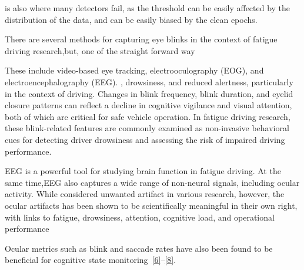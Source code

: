 is also where many detectors fail, as the threshold can be easily affected by the distribution of the data, and can be easily biased by the clean epochs.


There are several methods for capturing eye blinks in the context of fatigue driving research,but, one of the straight forward way


These include video-based eye tracking, electrooculography (EOG), and electroencephalography (EEG).
, drowsiness, and reduced alertness, particularly in the context of driving. Changes in blink frequency, blink duration, and eyelid closure patterns can reflect a decline in cognitive vigilance and visual attention, both of which are critical for safe vehicle operation. In fatigue driving research, these blink-related features are commonly examined as non-invasive behavioral cues for detecting driver drowsiness and assessing the risk of impaired driving performance.





EEG is a powerful tool for studying brain function in fatigue driving. At the same time,EEG also captures a wide range of non-neural signals, including ocular activity.
While considered unwanted artifact in various research, however, the ocular artifacts has been shown to be scientifically meaningful in their own right, with links to fatigue, drowsiness, attention, cognitive load, and operational performance




Ocular metrics such as blink and saccade rates have also been found to be beneficial for cognitive state monitoring \href{javascript:void()}{[6]}–​\href{javascript:void()}{[8]}.



